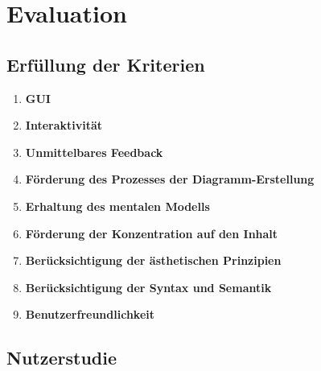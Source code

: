 
\chapter{Evaluation}
\label{chapter:evaluation}

\section{Erfüllung der Kriterien}

\begin{enumerate}[label={K.\arabic*}]

\item
\label{eval:gui}
\textbf{GUI}

\item
\label{eval:interactivity}
\textbf{Interaktivität}

\item
\label{eval:immediate-feedback}
\textbf{Unmittelbares Feedback}

\item
\label{eval:editing-support}
\textbf{Förderung des Prozesses der Diagramm-Erstellung}

\item
\label{eval:mental-map}
\textbf{Erhaltung des mentalen Modells}

\item
\label{eval:focus-on-the-content}
\textbf{Förderung der Konzentration auf den Inhalt}

\item
\label{eval:aesthetics-criteria}
\textbf{Berücksichtigung der ästhetischen Prinzipien}


\item
\label{eval:syntax-and-semantics}
\textbf{Berücksichtigung der Syntax und Semantik}

\item
\label{eval:user-friendly}
\textbf{Benutzerfreundlichkeit}

\end{enumerate}


\section{Nutzerstudie}

